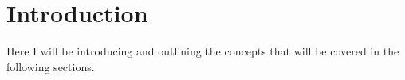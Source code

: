\section{Introduction}
\label{lr:intro}
	Here I will be introducing and outlining the concepts that will be covered in the following sections.
	
%	
%	
%	
